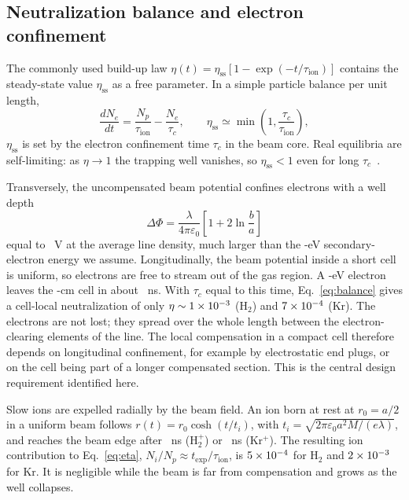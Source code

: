 \documentclass[aps,prab,10pt,twocolumn,superscriptaddress,showpacs,floatfix]{revtex4-2}
\newcommand{\Htwo}{\mathrm{H}_2}
\begin{document}
\subsection{Neutralization balance and electron confinement}

The commonly used build-up law $\eta(t)=\eta_{\mathrm{ss}}[1-\exp(-t/\tau_{\mathrm{ion}})]$
contains the steady-state value $\eta_{\mathrm{ss}}$ as a free parameter. In a simple
particle balance per unit length,
\begin{equation}
\frac{dN_e}{dt}=\frac{N_p}{\tau_{\mathrm{ion}}}-\frac{N_e}{\tau_c},
\qquad
\eta_{\mathrm{ss}}\simeq\min\!\left(1,\frac{\tau_c}{\tau_{\mathrm{ion}}}\right),
\label{eq:balance}
\end{equation}
$\eta_{\mathrm{ss}}$ is set by the electron confinement time $\tau_c$ in the beam
core. Real equilibria are self-limiting: as $\eta\to1$ the trapping well vanishes, so
$\eta_{\mathrm{ss}}<1$ even for long $\tau_c$~\cite{Gabovich1977}.

Transversely, the uncompensated beam potential confines electrons with a well depth
\begin{equation}
\Delta\Phi=\frac{\lambda}{4\pi\varepsilon_0}\left[1+2\ln\frac{b}{a}\right]
\label{eq:well}
\end{equation}
equal to \numwellavg~V at the average line density, much larger than the
\numEeev-eV secondary-electron energy we assume. Longitudinally, the beam potential
inside a short cell is uniform, so electrons are free to stream out of the gas region.
A \numEeev-eV electron leaves the \numLcellcm-cm cell in about \numtescapens~ns. With
$\tau_c$ equal to this time, Eq.~\eqref{eq:balance} gives a cell-local neutralization of only
$\eta\sim1\times10^{-3}$ ($\Htwo$) and $7\times10^{-4}$ (Kr). The electrons are not lost;
they spread over the whole length between the electron-clearing elements of the line.
The local compensation in a compact cell therefore depends on longitudinal confinement,
for example by electrostatic end plugs, or on the cell being part of a longer
compensated section. This is the central design requirement identified here.

Slow ions are expelled radially by the beam field. An ion born at rest at $r_0=a/2$ in
a uniform beam follows $r(t)=r_0\cosh(t/t_i)$, with
$t_i=\sqrt{2\pi\varepsilon_0a^2M/(e\lambda)}$, and reaches the beam edge after
\numtexpelHtwons~ns ($\Htwo^+$) or \numtexpelKrns~ns (Kr$^+$). The resulting ion
contribution to Eq.~\eqref{eq:eta}, $N_i/N_p\approx t_{\mathrm{exp}}/\tau_{\mathrm{ion}}$,
is $5\times10^{-4}$ for $\Htwo$ and $2\times10^{-3}$ for Kr. It is negligible while the
beam is far from compensation and grows as the well collapses.
\end{document}
